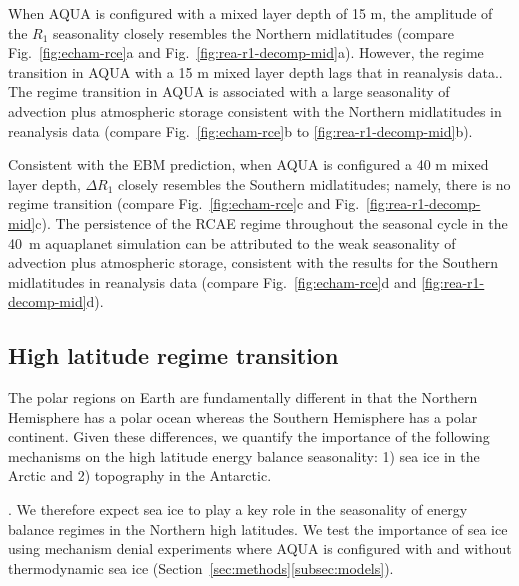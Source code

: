 \documentclass{ametsocV5}
\begin{document}
  When AQUA is configured with a mixed layer depth of 15 m, the amplitude of the \(R_{1}\) seasonality closely resembles the Northern midlatitudes (compare Fig.~\ref{fig:echam-rce}a and Fig.~\ref{fig:rea-r1-decomp-mid}a). However, the regime transition in AQUA with a 15 m mixed layer depth lags that in reanalysis data.. The regime transition in AQUA is associated with a large seasonality of advection plus atmospheric storage consistent with the Northern midlatitudes in reanalysis data (compare Fig.~\ref{fig:echam-rce}b to \ref{fig:rea-r1-decomp-mid}b). 
  
  Consistent with the EBM prediction, when AQUA is configured a 40 m mixed layer depth, \(\Delta R_{1}\) closely resembles the Southern midlatitudes; namely, there is no regime transition (compare Fig.~\ref{fig:echam-rce}c and Fig.~\ref{fig:rea-r1-decomp-mid}c). The persistence of the RCAE regime throughout the seasonal cycle in the 40~m aquaplanet simulation can be attributed to the weak seasonality of advection plus atmospheric storage, consistent with the results for the Southern midlatitudes in reanalysis data (compare Fig.~\ref{fig:echam-rce}d and \ref{fig:rea-r1-decomp-mid}d).

  \subsection{High latitude regime transition} \label{subsec:ice}
  The polar regions on Earth are fundamentally different in that the Northern Hemisphere has a polar ocean whereas the Southern Hemisphere has a polar continent. Given these differences, we quantify the importance of the following mechanisms on the high latitude energy balance seasonality: 1) sea ice in the Arctic and 2) topography in the Antarctic.
  
   \citep{andreas1979, maykut1982}. We therefore expect sea ice to play a key role in the seasonality of energy balance regimes in the Northern high latitudes. We test the importance of sea ice using mechanism denial experiments where AQUA is configured with and without thermodynamic sea ice (Section~\ref{sec:methods}\ref{subsec:models}).
\end{document}
